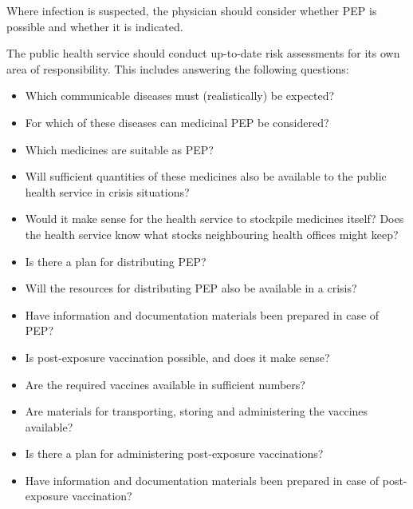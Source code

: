 \documentclass{article}
\begin{document}
Where infection is suspected, the physician should consider whether PEP is possible and whether it is indicated.


The public health service should conduct up-to-date risk assessments for its own area of responsibility. This includes answering the following questions:

\begin{itemize}
\item Which communicable diseases must (realistically) be expected?


\item For which of these diseases can medicinal PEP be considered?


\item Which medicines are suitable as PEP?


\item Will sufficient quantities of these medicines also be available to the public health service in crisis situations?


\item Would it make sense for the health service to stockpile medicines itself? Does the health service know what stocks neighbouring health offices might keep?


\end{itemize}
\begin{itemize}
\item Is there a plan for distributing PEP?


\item Will the resources for distributing PEP also be available in a crisis?


\item Have information and documentation materials been prepared in case of PEP?


\item Is post-exposure vaccination possible, and does it make sense?


\item Are the required vaccines available in sufficient numbers?


\item Are materials for transporting, storing and administering the vaccines available?


\item Is there a plan for administering post-exposure vaccinations?


\item Have information and documentation materials been prepared in case of post-exposure vaccination?


\end{itemize}
\end{document}
